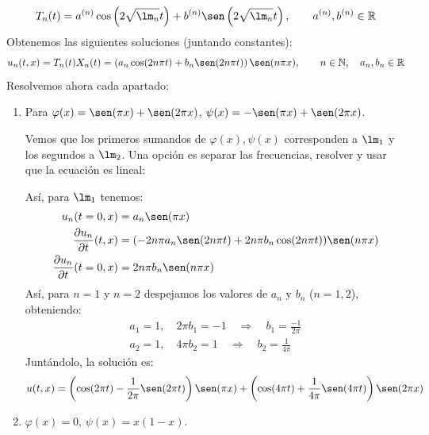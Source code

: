 \begin{ejemplo}
    \begin{equation*}
        T_n(t) = a^{(n)}\cos\left(2\sqrt{\lm_n}t\right) + b^{(n)}\sen\left(2\sqrt{\lm_n}t\right),\qquad a^{(n)},b^{(n)}\in \mathbb{R}
    \end{equation*}
    Obtenemos las siguientes soluciones (juntando constantes):
    \begin{equation*}
        u_n(t,x) = T_n(t)X_n(t) = \left(a_n \cos(2n\pi t) + b_n\sen(2n\pi t)\right)\sen(n\pi x), \qquad n\in \mathbb{N},\quad a_n,b_n\in \mathbb{R}
    \end{equation*}
    Resolvemos ahora cada apartado:
    \begin{enumerate}[label=\alph*)]
        \item Para $\varphi(x) = \sen(\pi x)+\sen(2\pi x)$, $\psi(x) = -\sen(\pi x)+\sen(2\pi x)$.

            Vemos que los primeros sumandos de $\varphi(x),\psi(x)$ corresponden a $\lm_1$ y los segundos a $\lm_2$. Una opción es separar las frecuencias, resolver y usar que la ecuación es lineal:

            Así, para $\lm_1$ tenemos:
            \begin{align*}
                u_n(t=0,x) &= a_n\sen(\pi x) \\
                \frac{\partial u_n}{\partial t}(t,x) &= (-2n\pi a_n\sen(2n\pi t) + 2n\pi b_n\cos(2n\pi t)) \sen(n\pi x) \\
                \frac{\partial u_n}{\partial t}(t=0,x) &=  2n\pi b_n  \sen(n\pi x)
            \end{align*}
            Así, para $n=1$ y $n=2$ despejamos los valores de $a_n$ y $b_n$ ($n=1,2$), obteniendo:
            \begin{gather*}
                a_1 = 1, \quad 2\pi b_1 = -1 \quad\Longrightarrow\quad b_1 = \frac{-1}{2\pi} \\
                a_2 = 1, \quad 4\pi b_2 = 1 \quad\Longrightarrow\quad b_2 = \frac{1}{4\pi}
            \end{gather*}
            Juntándolo, la solución es:
            \begin{equation*}
                u(t,x) = \left(\cos(2\pi t) - \frac{1}{2\pi}\sen(2\pi t)\right)\sen(\pi x) + \left(\cos(4\pi t) + \frac{1}{4\pi}\sen(4\pi t)\right)\sen(2\pi x)
            \end{equation*}
        \item $\varphi(x) = 0$, $\psi(x) = x(1-x)$.


\end{enumerate}
\end{ejemplo}
